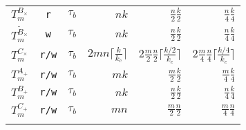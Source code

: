 \begin{figure}[!t]
{\begin{tabular}{l| ccrrr}
  $T_{m}^{B_{\times}}$                  & \texttt{r}
                                        & $\tau_{b}$
                                        & $nk$
                                        & $\frac{n}{2} \frac{k}{2}$
                                        & $\frac{n}{4} \frac{k}{4}$ \\
  $T_{m}^{{\widetilde B}_{\times}}$       & \texttt{w}
                                        & $\tau_{b}$
                                        & $nk$
                                        & $\frac{n}{2} \frac{k}{2}$
                                        & $\frac{n}{4} \frac{k}{4}$ \\
  $T_{m}^{C_{\times}}$ \fromto{}{(*)}                 & \texttt{r/w}
                                        & $\tau_{b}$
                                        & $2mn\lceil\frac{k}{k_c}\rceil$
                                        & $2\frac{m}{2}\frac{n}{2}\lceil\frac{k/2}{k_c}\rceil $
                                        & $2\frac{m}{4}\frac{n}{4}\lceil\frac{k/4}{k_c}\rceil $ \\
  \hline
  $T_{m}^{A_{+}}$                       & \texttt{r/w}
                                        & $\tau_{b}$
                                        & $mk$
                                        & $\frac{m}{2} \frac{k}{2}$
                                        & $\frac{m}{4} \frac{k}{4}$ \\
  $T_{m}^{B_{+}}$                       & \texttt{r/w}
                                        & $\tau_{b}$
                                        & $nk$
                                        & $\frac{n}{2} \frac{k}{2}$
                                        & $\frac{n}{4} \frac{k}{4}$ \\
  $T_{m}^{C_{+}}$                       & \texttt{r/w}
                                        & $\tau_{b}$
                                        & $mn$
                                        & $\frac{m}{2} \frac{n}{2}$
                                        & $\frac{m}{4} \frac{n}{4}$ \\


  \whline
  \end{tabular}
}


\vspace{0.2in}


\end{figure}
